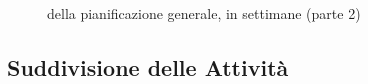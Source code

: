 \begin{figure}[H]
\label{tab:genweeks}
\caption{ della pianificazione generale, in settimane (parte 2)}
\end{figure}




\subsection{Suddivisione delle Attività}
